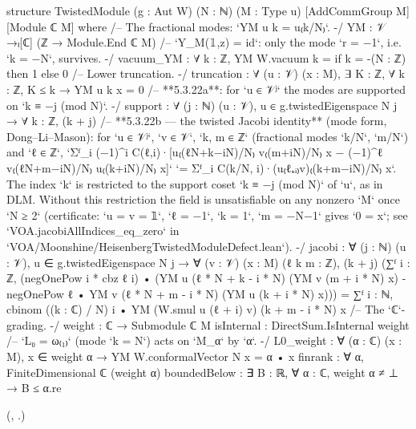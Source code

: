 \begin{leancode}
structure TwistedModule (g : Aut W) (N : ℕ) (M : Type u) [AddCommGroup M] [Module ℂ M] where
  /-- The fractional modes: `YM u k = u₍k/N₎`. -/
  YM : 𝒱 →ₗ[ℂ] (ℤ → Module.End ℂ M)
  /-- `Y_M(𝟙,z) = id`: only the mode `r = −1`, i.e. `k = −N`, survives. -/
  vacuum_YM : ∀ k : ℤ, YM W.vacuum k = if k = -(N : ℤ) then 1 else 0
  /-- Lower truncation. -/
  truncation : ∀ (u : 𝒱) (x : M), ∃ K : ℤ, ∀ k : ℤ, K ≤ k → YM u k x = 0
  /-- **5.3.22a**: for `u ∈ 𝒱ʲ` the modes are supported on `k ≡ −j (mod N)`. -/
  support : ∀ (j : ℕ) (u : 𝒱), u ∈ g.twistedEigenspace N j →
    ∀ k : ℤ, (k + j) %
  /-- **5.3.22b — the twisted Jacobi identity** (mode form, Dong–Li–Mason): for `u ∈ 𝒱ʲ`,
  `v ∈ 𝒱`, `k, m ∈ ℤ` (fractional modes `k/N`, `m/N`) and `ℓ ∈ ℤ`,
  `Σᶠ_i (−1)^i C(ℓ,i)·[u₍(ℓN+k−iN)/N₎ v₍(m+iN)/N₎ x − (−1)^ℓ v₍(ℓN+m−iN)/N₎ u₍(k+iN)/N₎ x]`
  `= Σᶠ_i C(k/N, i)·(u₍ℓ₊ᵢ₎v)₍(k+m−iN)/N₎ x`.
  The index `k` is restricted to the support coset `k ≡ −j (mod N)` of `u`, as in DLM.  Without
  this restriction the field is unsatisfiable on any nonzero `M` once `N ≥ 2` (certificate:
  `u = v = 𝟙`, `ℓ = −1`, `k = 1`, `m = −N−1` gives `0 = x`; see
  `VOA.jacobiAllIndices_eq_zero` in `VOA/Moonshine/HeisenbergTwistedModuleDefect.lean`). -/
  jacobi : ∀ (j : ℕ) (u : 𝒱), u ∈ g.twistedEigenspace N j → ∀ (v : 𝒱) (x : M) (ℓ k m : ℤ),
    (k + j) %
    (∑ᶠ i : ℤ, (negOnePow i * cbz ℓ i) •
        (YM u (ℓ * N + k - i * N) (YM v (m + i * N) x)
          - negOnePow ℓ • YM v (ℓ * N + m - i * N) (YM u (k + i * N) x)))
      = ∑ᶠ i : ℕ, cbinom ((k : ℂ) / N) i • YM (W.smul u (ℓ + i) v) (k + m - i * N) x
  /-- The `ℂ`-grading. -/
  weight : ℂ → Submodule ℂ M
  isInternal : DirectSum.IsInternal weight
  /-- `L₀ = ω₍₁₎` (mode `k = N`) acts on `M_α` by `α`. -/
  L0_weight : ∀ (α : ℂ) (x : M), x ∈ weight α → YM W.conformalVector N x = α • x
  finrank : ∀ α, FiniteDimensional ℂ (weight α)
  boundedBelow : ∃ B : ℝ, ∀ α : ℂ, weight α ≠ ⊥ → B ≤ α.re
\end{leancode}
(, .)

